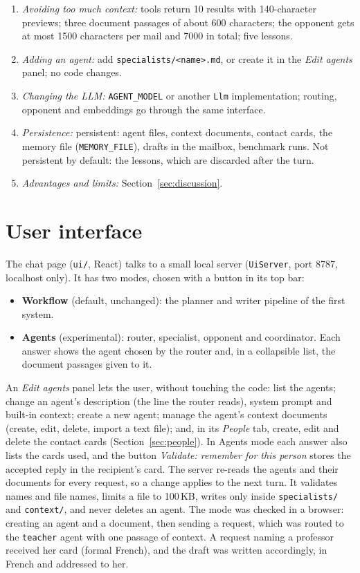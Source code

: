 \documentclass[11pt,a4paper]{article}
\newcommand{\code}[1]{\texttt{#1}}
\begin{document}
\begin{enumerate}
  \item \emph{Avoiding too much context:} tools return 10 results with 140-character previews; three document passages of
        about 600 characters; the opponent gets at most 1500 characters per mail and 7000 in total; five lessons.
  \item \emph{Adding an agent:} add \code{specialists/<name>.md}, or create it in the \emph{Edit agents} panel; no code changes.
  \item \emph{Changing the LLM:} \code{AGENT\_MODEL} or another \code{Llm} implementation; routing, opponent and embeddings
        go through the same interface.
  \item \emph{Persistence:} persistent: agent files, context documents, contact cards, the memory file (\code{MEMORY\_FILE}),
        drafts in the mailbox, benchmark runs. Not persistent by default: the lessons, which are discarded after the turn.
  \item \emph{Advantages and limits:} Section~\ref{sec:discussion}.
\end{enumerate}

\section{User interface}
\label{sec:ui}
The chat page (\code{ui/}, React) talks to a small local server (\code{UiServer}, port 8787, localhost only). It has
two modes, chosen with a button in its top bar:
\begin{itemize}
  \item \textbf{Workflow} (default, unchanged): the planner and writer pipeline of the first system.
  \item \textbf{Agents} (experimental): router, specialist, opponent and coordinator. Each answer shows the agent chosen
        by the router and, in a collapsible list, the document passages given to it.
\end{itemize}
An \emph{Edit agents} panel lets the user, without touching the code:
list the agents; change an agent's description (the line the router reads), system prompt and built-in context;
create a new agent; manage the agent's context documents (create, edit, delete, import a text file); and, in its
\emph{People} tab, create, edit and delete the contact cards (Section~\ref{sec:people}).
In Agents mode each answer also lists the cards used, and the button \emph{Validate: remember for this person} stores
the accepted reply in the recipient's card.
The server re-reads the agents and their documents for every request, so a change applies to the next turn.
It validates names and file names, limits a file to 100\,KB, writes only inside \code{specialists/} and \code{context/},
and never deletes an agent. The mode was checked in a browser: creating an agent and a document, then sending a request,
which was routed to the \code{teacher} agent with one passage of context. A request naming a professor received her card
(formal French), and the draft was written accordingly, in French and addressed to her.
\end{document}
